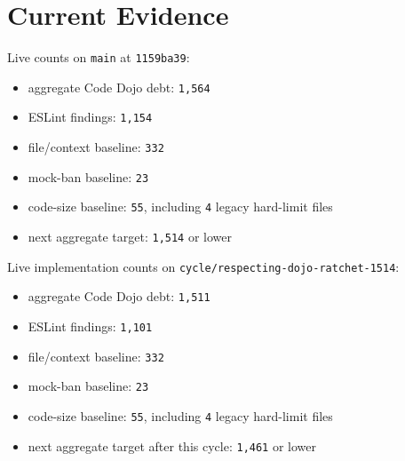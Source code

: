 \section{Current Evidence}\label{record-226-current-evidence}

Live counts on \texttt{m\allowbreak{}a\allowbreak{}i\allowbreak{}n} at \texttt{1\allowbreak{}1\allowbreak{}5\allowbreak{}9\allowbreak{}b\allowbreak{}a\allowbreak{}3\allowbreak{}9}:

\begin{itemize}
\tightlist
\item
  aggregate Code Dojo debt: \texttt{1\allowbreak{},\allowbreak{}5\allowbreak{}6\allowbreak{}4}
\item
  ESLint findings: \texttt{1\allowbreak{},\allowbreak{}1\allowbreak{}5\allowbreak{}4}
\item
  file/context baseline: \texttt{3\allowbreak{}3\allowbreak{}2}
\item
  mock-ban baseline: \texttt{2\allowbreak{}3}
\item
  code-size baseline: \texttt{5\allowbreak{}5}, including \texttt{4} legacy hard-limit files
\item
  next aggregate target: \texttt{1\allowbreak{},\allowbreak{}5\allowbreak{}1\allowbreak{}4} or lower
\end{itemize}

Live implementation counts on \texttt{c\allowbreak{}y\allowbreak{}c\allowbreak{}l\allowbreak{}e\allowbreak{}/\allowbreak{}r\allowbreak{}e\allowbreak{}s\allowbreak{}p\allowbreak{}e\allowbreak{}c\allowbreak{}t\allowbreak{}i\allowbreak{}n\allowbreak{}g\allowbreak{}-\allowbreak{}d\allowbreak{}o\allowbreak{}j\allowbreak{}o\allowbreak{}-\allowbreak{}r\allowbreak{}a\allowbreak{}t\allowbreak{}c\allowbreak{}h\allowbreak{}e\allowbreak{}t\allowbreak{}-\allowbreak{}1\allowbreak{}5\allowbreak{}1\allowbreak{}4}:

\begin{itemize}
\tightlist
\item
  aggregate Code Dojo debt: \texttt{1\allowbreak{},\allowbreak{}5\allowbreak{}1\allowbreak{}1}
\item
  ESLint findings: \texttt{1\allowbreak{},\allowbreak{}1\allowbreak{}0\allowbreak{}1}
\item
  file/context baseline: \texttt{3\allowbreak{}3\allowbreak{}2}
\item
  mock-ban baseline: \texttt{2\allowbreak{}3}
\item
  code-size baseline: \texttt{5\allowbreak{}5}, including \texttt{4} legacy hard-limit files
\item
  next aggregate target after this cycle: \texttt{1\allowbreak{},\allowbreak{}4\allowbreak{}6\allowbreak{}1} or lower
\end{itemize}


